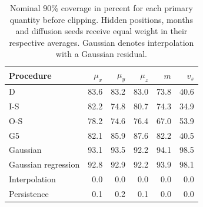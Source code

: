 \documentclass{article}
\begin{document}
\begin{table}[ht]
\centering
\caption{Nominal 90\% coverage in percent for each primary quantity before clipping. Hidden positions, months and diffusion seeds receive equal weight in their respective averages. Gaussian denotes interpolation with a Gaussian residual.}
\label{tab:channelcoverage}
\begin{tabular}{lrrrrr}
\toprule
Procedure & $\mu_x$ & $\mu_y$ & $\mu_z$ & $m$ & $v_s$ \\
\midrule
D & 83.6 & 83.2 & 83.0 & 73.8 & 40.6 \\
I-S & 82.2 & 74.8 & 80.7 & 74.3 & 34.9 \\
O-S & 78.2 & 74.6 & 76.4 & 67.0 & 53.9 \\
G5 & 82.1 & 85.9 & 87.6 & 82.2 & 40.5 \\
Gaussian & 93.1 & 93.5 & 92.2 & 94.1 & 98.5 \\
Gaussian regression & 92.8 & 92.9 & 92.2 & 93.9 & 98.1 \\
Interpolation & 0.0 & 0.0 & 0.0 & 0.0 & 0.0 \\
Persistence & 0.1 & 0.2 & 0.1 & 0.0 & 0.0 \\
\bottomrule
\end{tabular}
\end{table}
\end{document}
